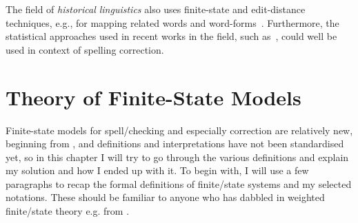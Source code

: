 \documentclass[officiallayout,final]{unihelcompling}
\begin{document}
The field of \emph{historical linguistics} also uses finite-state and
edit-distance techniques, e.g., for mapping related words and
word-forms~\citep{porta2013edit}. Furthermore, the statistical approaches used
in recent works in the field, such as~\citet{petterson2013smt}, could well be
used in context of spelling correction. 

\section{Theory of Finite-State Models}
\label{sec:finite-state-theory}

Finite-state models for spell\-/checking and especially correction are relatively
new, beginning from \citep{oflazer1996errortolerant}, and
definitions and interpretations have not been standardised yet, so in this
chapter I will try to go through the various definitions and explain my
solution and how I ended up with it. To begin with, I will use a few paragraphs
to recap the formal definitions of finite\-/state systems and my selected
notations. These should be familiar to anyone who has dabbled in weighted
finite\-/state theory e.g. from \citet{aho2007compilers,mohri1997finitestate}.
\end{document}
